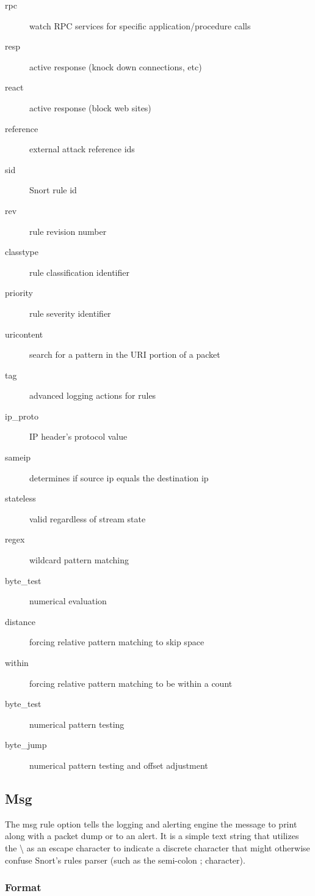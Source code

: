 \documentclass[english]{report}
\begin{document}
\begin{description}
\item [rpc]watch RPC services for specific application/procedure calls 
\item [resp]active response (knock down connections, etc)
\item [react]active response (block web sites) 
\item [reference]external attack reference ids
\item [sid]Snort rule id 
\item [rev]rule revision number
\item [classtype]rule classification identifier
\item [priority]rule severity identifier
\item [uricontent]search for a pattern in the URI portion of a packet 
\item [tag]advanced logging actions for rules
\item [ip\_proto]IP header's protocol value
\item [sameip]determines if source ip equals the destination ip
\item [stateless]valid regardless of stream state
\item [regex]wildcard pattern matching
\item [byte\_test]numerical evaluation
\item [distance]forcing relative pattern matching to skip space
\item [within]forcing relative pattern matching to be within a count
\item [byte\_test]numerical pattern testing
\item [byte\_jump]numerical pattern testing and offset adjustment
\end{description}

\subsection{Msg}

The msg rule option tells the logging and alerting engine the message
to print along with a packet dump or to an alert. It is a simple text
string that utilizes the \textbackslash{} as an
escape character to indicate a discrete character that might otherwise
confuse Snort's rules parser (such as the semi-colon ;
character).

\subsubsection{Format}
\end{document}
